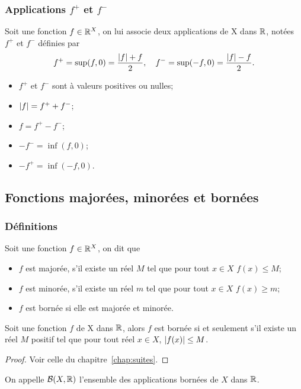 \subsubsection{Applications $f^+$ et $f^-$}

\begin{defdef}
  Soit une fonction $f \in \mathbb{R}^X$, on lui associe deux applications de X dans $\mathbb{R}$, notées $f^+$ et $f^-$ définies par
  \begin{equation}
    f^+=\sup(f,0)=\frac{\left\lvert f\right\rvert+f}{2}, \quad f^-=\sup(-f,0)=\frac{\left\lvert f\right\rvert-f}{2}.
  \end{equation}
\end{defdef}
\begin{prop}[Propriétés]
  \begin{itemize}
  \item $f^+$ et $f^-$ sont à valeurs positives ou nulles;
  \item $\left\lvert f\right\rvert=f^++f^-$;
  \item $f=f^+-f^-$;
  \item $-f^-=\inf(f,0)$;
  \item $-f^+=\inf(-f,0)$.
  \end{itemize}
\end{prop}

\subsection{Fonctions majorées, minorées et bornées}

\subsubsection{Définitions}
\begin{defdef}
  Soit une fonction $f \in \mathbb{R}^X$, on dit que
  \begin{itemize}
  \item $f$ est majorée, s'il existe un réel $M$ tel que pour tout $x \in X$ $f(x) \leq M$;
  \item $f$ est minorée, s'il existe un réel $m$ tel que pour tout $x \in X$ $f(x) \geq m$;
  \item $f$ est bornée si elle est majorée et minorée.
  \end{itemize}
\end{defdef}
\begin{prop}
  Soit une fonction $f$ de X dans $\mathbb{R}$, alors $f$ est bornée si et seulement s'il existe un réel $M$ positif tel que pour tout réel $x \in X$, $\left\lvert f(x)\right\rvert \leq M$.
\end{prop}
\begin{proof}
  Voir celle du chapitre~\ref{chap:suites}.
\end{proof}
\begin{defdef}
  On appelle $\mathcal{B}(X,\mathbb{R})$ l'ensemble des applications bornées de $X$ dans $\mathbb{R}$.
\end{defdef}

